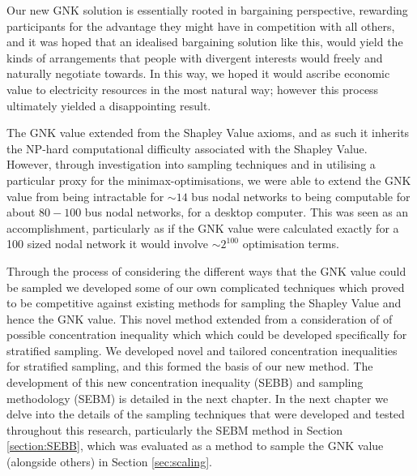 Our new GNK solution is essentially rooted in bargaining perspective, rewarding participants for the advantage they might have in competition with all others, 
and it was hoped that an idealised bargaining solution like this, would yield the kinds of arrangements that people with divergent interests would freely and naturally negotiate towards.
In this way, we hoped it would ascribe economic value to electricity resources in the most natural way; however this process ultimately yielded a disappointing result.


The GNK value extended from the Shapley Value axioms, and as such it inherits the NP-hard computational difficulty associated with the Shapley Value.
However, through investigation into sampling techniques and in utilising a particular proxy for the minimax-optimisations, we were able to extend the GNK value from being intractable for $\sim 14$ bus nodal networks to being computable for about $80-100$ bus nodal networks, for a desktop computer.
This was seen as an accomplishment, particularly as if the GNK value were calculated exactly for a 100 sized nodal network it would involve $\sim 2^{100}$ optimisation terms.

Through the process of considering the different ways that the GNK value could be sampled we developed some of our own complicated techniques which proved to be competitive against existing methods for sampling the Shapley Value and hence the GNK value.
This novel method extended from a consideration of of possible concentration inequality which which could be developed specifically for stratified sampling.
We developed novel and tailored concentration inequalities for stratified sampling, and this formed the basis of our new method.
The development of this new concentration inequality (SEBB) and sampling methodology (SEBM) is detailed in the next chapter.
In the next chapter we delve into the details of the sampling techniques that were developed and tested throughout this research, particularly the \textsc{SEBM} method in Section \ref{section:SEBB}, which was evaluated as a method to sample the GNK value (alongside others) in Section \ref{sec:scaling}.









